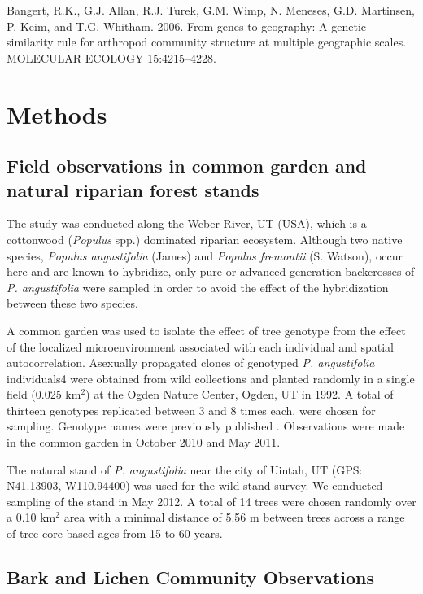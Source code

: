 \documentclass[fleqn,10pt]{wlscirep}
\begin{document}
Bangert, R.K., G.J. Allan, R.J. Turek, G.M. Wimp, N. Meneses,
G.D. Martinsen, P. Keim, and T.G. Whitham.  2006.  From genes to
geography: A genetic similarity rule for arthropod community structure
at multiple geographic scales.  MOLECULAR ECOLOGY 15:4215–4228.

\section*{Methods}

\subsection*{Field observations in common garden and natural riparian
  forest stands}

The study was conducted along the Weber River, UT (USA), which is a
cottonwood (\textit{Populus} spp.) dominated riparian
ecosystem. Although two native species, \textit{Populus angustifolia}
(James) and \textit{Populus fremontii} (S. Watson), occur here and are
known to hybridize, only pure or advanced generation backcrosses of
\textit{P. angustifolia} were sampled in order to avoid the effect of
the hybridization between these two species.

A common garden was used to isolate the effect of tree genotype from
the effect of the localized microenvironment associated with each
individual and spatial autocorrelation. Asexually propagated clones of
genotyped \textit{P. angustifolia} individuals4 were obtained from
wild collections and planted randomly in a single field (0.025 km$^2$)
at the Ogden Nature Center, Ogden, UT in 1992. A total of thirteen
genotypes replicated between 3 and 8 times each, were chosen for
sampling. Genotype names were previously published
\cite{Martinsen}. Observations were made in the common garden in
October 2010 and May 2011.

The natural stand of \textit{P. angustifolia} near the city of Uintah,
UT (GPS:  N41.13903, W110.94400) was used for the wild stand
survey. We conducted sampling of the stand in May 2012. A total of 14
trees were chosen randomly over a 0.10 km$^2$ area with a minimal
distance of 5.56 m between trees across a range of tree core based
ages from 15 to 60 years.

\subsection*{Bark and Lichen Community Observations}
\end{document}
